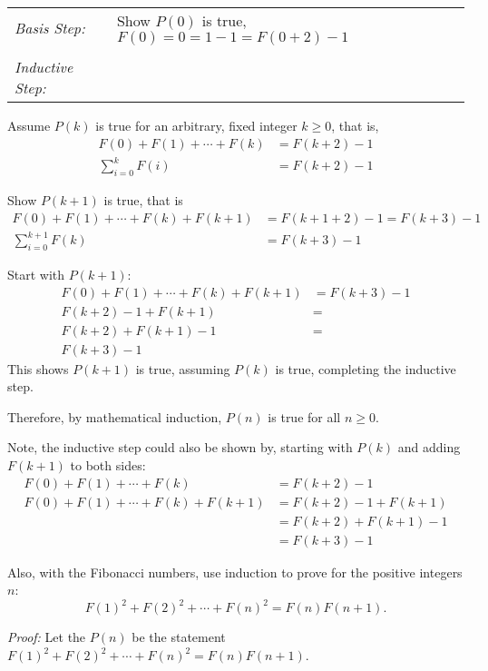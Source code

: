 \begin{questions}
\begin{solution}
  \smallskip
  \begin{tabular}{lp{4in}}
    \textit{Basis Step:} & Show $P(0)$ is true, $F(0) = 0 = 1 - 1 = F(0+2) - 1$ \\
     & \\
   \textit{Inductive Step:} &  \\
  \end{tabular}

  Assume $P(k)$ is true for an arbitrary, fixed integer $k \geq 0$, that is,
  \begin{align*}
    F(0) + F(1) + \cdots + F(k) &= F(k+2) - 1  \tag{IH} \\
    \sum_{i=0}^k F(i) &= F(k+2) - 1
  \end{align*}

  Show $P(k+1)$ is true, that is
  \begin{align*}
    F(0) + F(1) + \cdots + F(k) + F(k+1) &= F(k+1+2) - 1 = F(k+3) - 1 \\
    \sum_{i=0}^{k+1} F(k) &= F(k+3) - 1
  \end{align*}

  Start with $P(k+1)$:
  \begin{align*}
    F(0) + F(1) + \cdots + F(k) + F(k+1) &= F(k+3) - 1  \\
    F(k+2) - 1 + F(k+1) &= \tag{IH} \\
    F(k+2) + F(k+1) - 1 &= \\
    F(k+3) - 1
  \end{align*}
  This shows $P(k+1)$ is true, assuming $P(k)$ is true, completing the inductive step. 

  \smallskip
  Therefore, by mathematical induction, $P(n)$ is true for all $n \geq 0$.

  \smallskip
  Note, the inductive step could also be shown by, starting with $P(k)$ and adding $F(k+1)$ to both sides:
  \begin{align*}
    F(0) + F(1) + \cdots + F(k) &= F(k+2) - 1 \tag{IH} \\
    F(0) + F(1) + \cdots + F(k) + F(k+1) &= F(k+2) - 1 + F(k+1) \\
     &= F(k+2) + F(k+1) - 1 \\
     &= F(k+3) -1 
  \end{align*}
\end{solution}



  Also, with the Fibonacci numbers, use induction to prove for the positive integers $n$: 
\[ F(1)^2 + F(2)^2 + \cdots + F(n)^2 = F(n)F(n+1). \]
    \ifprintanswers
        \vspace{-10pt}
   \fi
\begin{solution}
  \textit{Proof:}
  Let the $P(n)$ be the statement $F(1)^2 + F(2)^2 + \cdots + F(n)^2 = F(n)F(n+1)$.


\end{solution}
\end{questions}
